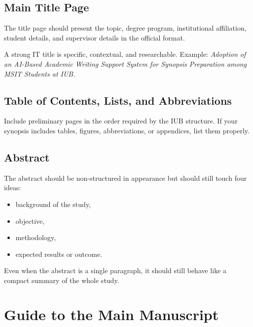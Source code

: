 \documentclass[11pt,a4paper]{article}
\begin{document}
\subsection{Main Title Page}

The title page should present the topic, degree program, institutional affiliation, student details, and supervisor details in the official format.

\begin{examplebox}
A strong IT title is specific, contextual, and researchable. Example: \emph{Adoption of an AI-Based Academic Writing Support System for Synopsis Preparation among MSIT Students at IUB.}
\end{examplebox}

\subsection{Table of Contents, Lists, and Abbreviations}

Include preliminary pages in the order required by the IUB structure. If your synopsis includes tables, figures, abbreviations, or appendices, list them properly.

\subsection{Abstract}

The abstract should be non-structured in appearance but should still touch four ideas:

\begin{itemize}[leftmargin=*]
  \item background of the study,
  \item objective,
  \item methodology,
  \item expected results or outcome.
\end{itemize}

\begin{conceptbox}
Even when the abstract is a single paragraph, it should still behave like a compact summary of the whole study.
\end{conceptbox}

\section{Guide to the Main Manuscript}
\end{document}

